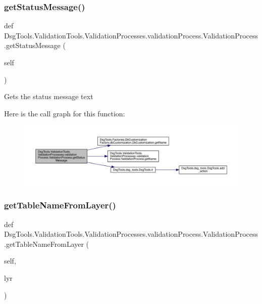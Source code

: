 \subsubsection{\texorpdfstring{get\+Status\+Message()}{getStatusMessage()}}
{\footnotesize\ttfamily def Dsg\+Tools.\+Validation\+Tools.\+Validation\+Processes.\+validation\+Process.\+Validation\+Process.\+get\+Status\+Message (\begin{DoxyParamCaption}\item[{}]{self }\end{DoxyParamCaption})}

\begin{DoxyVerb}Gets the status message text
\end{DoxyVerb}
 Here is the call graph for this function\+:
\nopagebreak
\begin{figure}[H]
\begin{center}
\leavevmode
\includegraphics[width=350pt]{class_dsg_tools_1_1_validation_tools_1_1_validation_processes_1_1validation_process_1_1_validation_process_a00ab1786a814a65c53db1fac5d3f6218_cgraph}
\end{center}
\end{figure}
\mbox{\label{class_dsg_tools_1_1_validation_tools_1_1_validation_processes_1_1validation_process_1_1_validation_process_af2197dc08fcfd047122fbf2a48bba20e}} 
\subsubsection{\texorpdfstring{get\+Table\+Name\+From\+Layer()}{getTableNameFromLayer()}}
{\footnotesize\ttfamily def Dsg\+Tools.\+Validation\+Tools.\+Validation\+Processes.\+validation\+Process.\+Validation\+Process.\+get\+Table\+Name\+From\+Layer (\begin{DoxyParamCaption}\item[{}]{self,  }\item[{}]{lyr }\end{DoxyParamCaption})}

